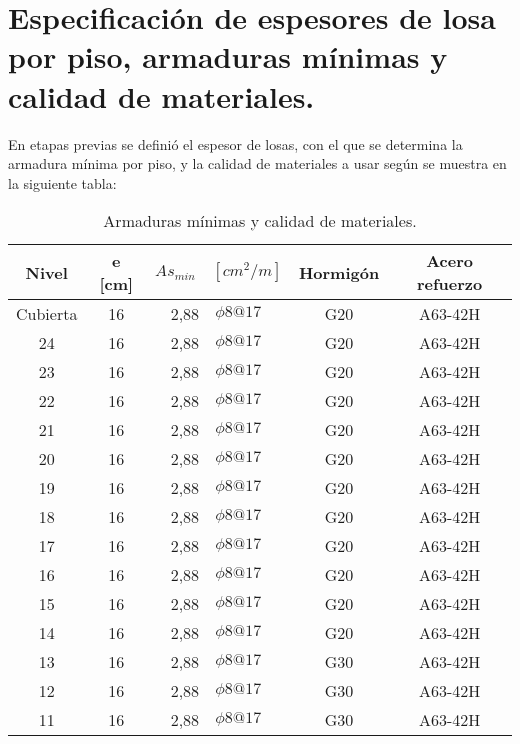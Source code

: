 \newpage
\section{Especificación de espesores de losa por piso, armaduras mínimas y calidad de materiales.}

    En etapas previas se definió el espesor de losas, con el que se determina la armadura mínima por piso, y la calidad de materiales a usar según se muestra en la siguiente tabla:
    
    \begin{table}[H]
      \centering
      \caption{Armaduras mínimas y calidad de materiales.}
         \begin{tabular}{ccrlcc}
            \hline
            \textbf{Nivel} & \textbf{e [cm]} & \multicolumn{2}{c}{\boldmath{}\textbf{$As_{min} \quad [cm^2/m]$}\unboldmath{}} & \textbf{Hormigón} & \textbf{Acero refuerzo} \bigstrut\\
            \hline
            Cubierta & 16    & 2,88  & $\phi8@17$ & G20   & A63-42H \bigstrut[t]\\
            24    & 16    & 2,88  & $\phi8@17$ & G20   & A63-42H \\
            23    & 16    & 2,88  & $\phi8@17$ & G20   & A63-42H \\
            22    & 16    & 2,88  & $\phi8@17$ & G20   & A63-42H \\
            21    & 16    & 2,88  & $\phi8@17$ & G20   & A63-42H \\
            20    & 16    & 2,88  & $\phi8@17$ & G20   & A63-42H \\
            19    & 16    & 2,88  & $\phi8@17$ & G20   & A63-42H \\
            18    & 16    & 2,88  & $\phi8@17$ & G20   & A63-42H \\
            17    & 16    & 2,88  & $\phi8@17$ & G20   & A63-42H \\
            16    & 16    & 2,88  & $\phi8@17$ & G20   & A63-42H \\
            15    & 16    & 2,88  & $\phi8@17$ & G20   & A63-42H \\
            14    & 16    & 2,88  & $\phi8@17$ & G20   & A63-42H \\
            13    & 16    & 2,88  & $\phi8@17$ & G30   & A63-42H \\
            12    & 16    & 2,88  & $\phi8@17$ & G30   & A63-42H \\
            11    & 16    & 2,88  & $\phi8@17$ & G30   & A63-42H \\

\end{tabular}
\end{table}
